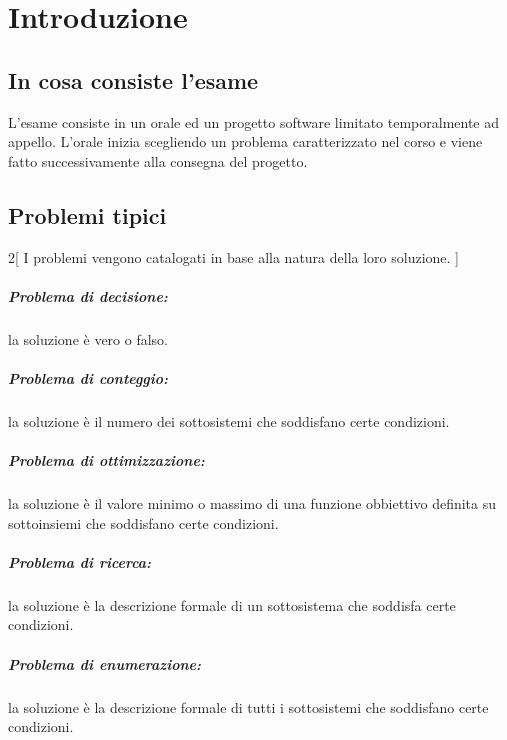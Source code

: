 \documentclass[\main/main.tex]{subfiles}
\begin{document}
\chapter{Introduzione}

\section{In cosa consiste l'esame}
L'esame consiste in un orale ed un progetto software limitato temporalmente ad appello. L'orale inizia scegliendo un problema caratterizzato nel corso e viene fatto successivamente alla consegna del progetto.

\section{Problemi tipici}
\begin{multicols}{2}[
    I problemi vengono catalogati in base alla natura della loro soluzione.
  ]
  \paragraph*{Problema di decisione:} la soluzione è vero o falso.
  \paragraph*{Problema di conteggio:} la soluzione è il numero dei sottosistemi che soddisfano certe condizioni.
  \paragraph*{Problema di ottimizzazione:} la soluzione è il valore minimo o massimo di una funzione obbiettivo definita su sottoinsiemi che soddisfano certe condizioni.
  \paragraph*{Problema di ricerca:} la soluzione è la descrizione formale di un sottosistema che soddisfa certe condizioni.
  \paragraph*{Problema di enumerazione:} la soluzione è la descrizione formale di tutti i sottosistemi che soddisfano certe condizioni.
\end{multicols}
\end{document}

